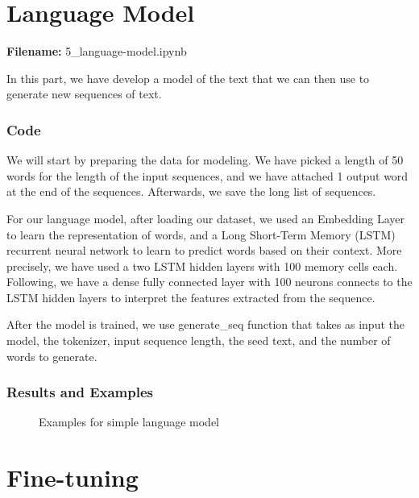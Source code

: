 \documentclass[12pt, a4paper]{article}
\begin{document}
\newpage
\part{Language Model}
\large{\textbf{Filename:} 5\_language-model.ipynb}

In this part, we have develop a model of the text that we can then use to generate new sequences of text.

\section*{Code}
We will start by preparing the data for modeling. 
We have picked a length of 50 words for the length of the input sequences, and we have attached 1 output word at the end of the sequences. Afterwards, we save the long list of sequences.


For our language model, after loading our dataset, we used an Embedding Layer to learn the representation of words, and a Long Short-Term Memory (LSTM) recurrent neural network to learn to predict words based on their context. More precisely, we have used a two LSTM hidden layers with 100 memory cells each. Following, we have a dense fully connected layer with 100 neurons connects to the LSTM hidden layers to interpret the features extracted from the sequence.

After the model is trained, we use generate\_seq function that takes as input the model, the tokenizer, input sequence length, the seed text, and the number of words to generate. 

\section*{Results and Examples}
\begin{figure}[H]
	\caption{Examples for simple language model}
	\label{normal-lm_examples}
\end{figure}


\newpage
\part{Fine-tuning}
\end{document}
